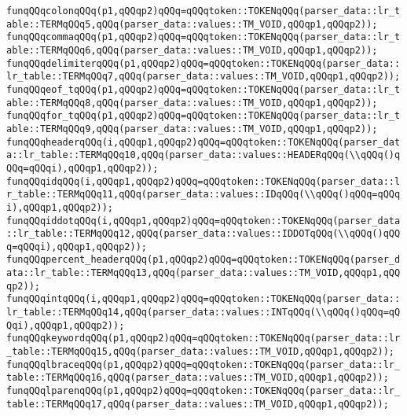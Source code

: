 \verb|funqQQqcolonqQQq(p1,qQQqp2)qQQq=qQQqtoken::TOKENqQQq(parser_data::lr_table::TERMqQQq5,qQQq(parser_data::values::TM_VOID,qQQqp1,qQQqp2));|\newline
\verb|funqQQqcommaqQQq(p1,qQQqp2)qQQq=qQQqtoken::TOKENqQQq(parser_data::lr_table::TERMqQQq6,qQQq(parser_data::values::TM_VOID,qQQqp1,qQQqp2));|\newline
\verb|funqQQqdelimiterqQQq(p1,qQQqp2)qQQq=qQQqtoken::TOKENqQQq(parser_data::lr_table::TERMqQQq7,qQQq(parser_data::values::TM_VOID,qQQqp1,qQQqp2));|\newline
\verb|funqQQqeof_tqQQq(p1,qQQqp2)qQQq=qQQqtoken::TOKENqQQq(parser_data::lr_table::TERMqQQq8,qQQq(parser_data::values::TM_VOID,qQQqp1,qQQqp2));|\newline
\verb|funqQQqfor_tqQQq(p1,qQQqp2)qQQq=qQQqtoken::TOKENqQQq(parser_data::lr_table::TERMqQQq9,qQQq(parser_data::values::TM_VOID,qQQqp1,qQQqp2));|\newline
\verb|funqQQqheaderqQQq(i,qQQqp1,qQQqp2)qQQq=qQQqtoken::TOKENqQQq(parser_data::lr_table::TERMqQQq10,qQQq(parser_data::values::HEADERqQQq(\\qQQq()qQQq=qQQqi),qQQqp1,qQQqp2));|\newline
\verb|funqQQqidqQQq(i,qQQqp1,qQQqp2)qQQq=qQQqtoken::TOKENqQQq(parser_data::lr_table::TERMqQQq11,qQQq(parser_data::values::IDqQQq(\\qQQq()qQQq=qQQqi),qQQqp1,qQQqp2));|\newline
\verb|funqQQqiddotqQQq(i,qQQqp1,qQQqp2)qQQq=qQQqtoken::TOKENqQQq(parser_data::lr_table::TERMqQQq12,qQQq(parser_data::values::IDDOTqQQq(\\qQQq()qQQq=qQQqi),qQQqp1,qQQqp2));|\newline
\verb|funqQQqpercent_headerqQQq(p1,qQQqp2)qQQq=qQQqtoken::TOKENqQQq(parser_data::lr_table::TERMqQQq13,qQQq(parser_data::values::TM_VOID,qQQqp1,qQQqp2));|\newline
\verb|funqQQqintqQQq(i,qQQqp1,qQQqp2)qQQq=qQQqtoken::TOKENqQQq(parser_data::lr_table::TERMqQQq14,qQQq(parser_data::values::INTqQQq(\\qQQq()qQQq=qQQqi),qQQqp1,qQQqp2));|\newline
\verb|funqQQqkeywordqQQq(p1,qQQqp2)qQQq=qQQqtoken::TOKENqQQq(parser_data::lr_table::TERMqQQq15,qQQq(parser_data::values::TM_VOID,qQQqp1,qQQqp2));|\newline
\verb|funqQQqlbraceqQQq(p1,qQQqp2)qQQq=qQQqtoken::TOKENqQQq(parser_data::lr_table::TERMqQQq16,qQQq(parser_data::values::TM_VOID,qQQqp1,qQQqp2));|\newline
\verb|funqQQqlparenqQQq(p1,qQQqp2)qQQq=qQQqtoken::TOKENqQQq(parser_data::lr_table::TERMqQQq17,qQQq(parser_data::values::TM_VOID,qQQqp1,qQQqp2));|\newline
